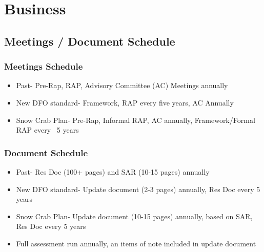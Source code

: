 \section{Business}
\subsection{Meetings / Document Schedule}

\begin{frame}

\frametitle{Meetings Schedule}

 \vspace*{-0.5cm}
\begin{block}

\begin{itemize}
\item Past- Pre-Rap, RAP, Advisory Committee (AC) Meetings annually
\item New DFO standard- Framework, RAP every five years, AC Annually
\item Snow Crab Plan- Pre-Rap, Informal RAP, AC annually, Framework/Formal RAP every ~5 years

\end{itemize}
\end{block}
\end{frame}



\begin{frame}

\frametitle{Document Schedule}

 \vspace*{-0.5cm}
\begin{block}

\begin{itemize}
\item Past- Res Doc (100+ pages) and SAR (10-15 pages) annually
\item New DFO standard- Update document (2-3 pages) annually, Res Doc every 5 years
\item Snow Crab Plan- Update document (10-15 pages) annually, based on SAR, Res Doc every 5 years
\item Full assessment run annually, an items of note included in update document

\end{itemize}

\end{block}

\end{frame}





